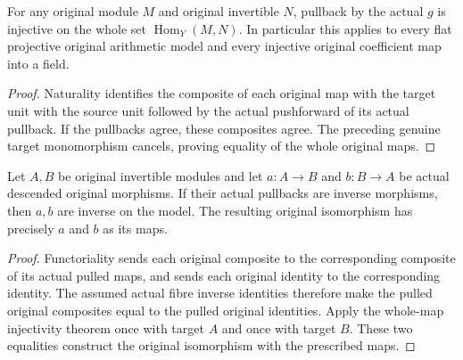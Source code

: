\begin{theorem}
\label{thm:kn-original-line-hom-injective}
\leanok
{}
For any original module $M$ and original invertible $N$, pullback by the
actual $g$ is injective on the whole set $\operatorname{Hom}_Y(M,N)$.
In particular this applies to every flat projective original arithmetic
model and every injective original coefficient map into a field.
\end{theorem}
\begin{proof}
Naturality identifies the composite of each original map with the
target unit with the source unit followed by the actual pushforward
of its actual pullback.  If the pullbacks agree, these composites
agree.  The preceding genuine target monomorphism cancels, proving
equality of the whole original maps.
\end{proof}

\begin{theorem}
\label{thm:kn-original-line-iso-from-descended-inverse}
\leanok
{}
Let $A,B$ be original invertible modules and let $a:A\to B$ and
$b:B\to A$ be actual descended original morphisms.  If their actual
pullbacks are inverse morphisms, then $a,b$ are inverse on the model.
The resulting original isomorphism has precisely $a$ and $b$ as its maps.
\end{theorem}
\begin{proof}
Functoriality sends each original composite to the corresponding
composite of its actual pulled maps, and sends each original identity
to the corresponding identity.  The assumed actual fibre inverse
identities therefore make the pulled original composites equal to
the pulled original identities.  Apply the whole-map injectivity
theorem once with target $A$ and once with target $B$.  These two
equalities construct the original isomorphism with the prescribed maps.
\end{proof}
